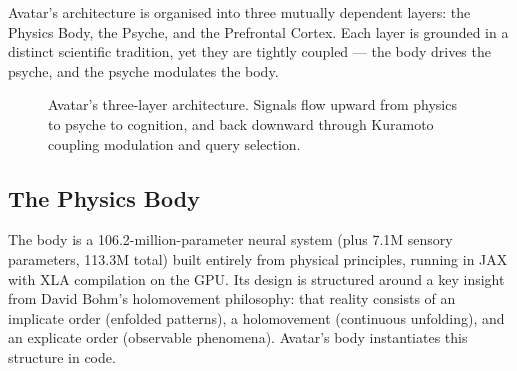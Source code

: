 \documentclass[11pt,a4paper]{article}
\begin{document}
Avatar's architecture is organised into three mutually dependent layers: the Physics Body,
the Psyche, and the Prefrontal Cortex. Each layer is grounded in a distinct scientific
tradition, yet they are tightly coupled --- the body drives the psyche, and the psyche
modulates the body.

\begin{figure}[htbp]
\centering
{}
\caption{Avatar's three-layer architecture. Signals flow upward from physics to psyche
to cognition, and back downward through Kuramoto coupling modulation and query selection.}
\end{figure}

\subsection{The Physics Body}

The body is a 106.2-million-parameter neural system (plus 7.1M sensory parameters,
113.3M total) built entirely from physical
principles, running in JAX with XLA compilation on the GPU. Its design is structured
around a key insight from David Bohm's holomovement philosophy: that reality consists of
an implicate order (enfolded patterns), a holomovement (continuous unfolding), and an
explicate order (observable phenomena). Avatar's body instantiates this structure in code.
\end{document}
